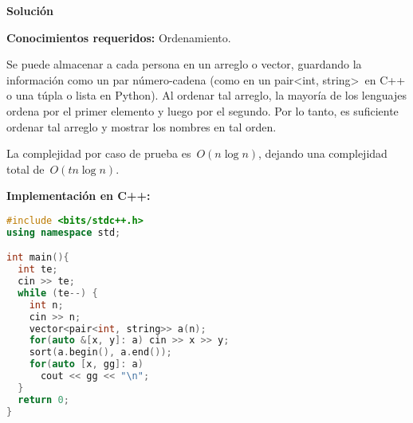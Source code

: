 \vspace*{0cm}
{\Large\textbf{Solución}}

\textbf{Conocimientos requeridos:} Ordenamiento.

Se puede almacenar a cada persona en un arreglo o vector, guardando la información
como un par número-cadena (como en un pair\textless int, string\textgreater \, en C++
o una túpla o lista en Python). Al ordenar tal arreglo, la mayoría de los lenguajes
ordena por el primer elemento y luego por el segundo. Por lo tanto, es suficiente
ordenar tal arreglo y mostrar los nombres en tal orden.

La complejidad por caso de prueba es~$O(n\log n)$, dejando una complejidad total
de~$O(tn \log n)$.

\textbf{Implementación en C++:}

\begin{lstlisting}[language=C++]
#include <bits/stdc++.h>
using namespace std;

int main(){
  int te;
  cin >> te;
  while (te--) {
    int n;
    cin >> n;
    vector<pair<int, string>> a(n);
    for(auto &[x, y]: a) cin >> x >> y;
    sort(a.begin(), a.end());
    for(auto [x, gg]: a)
      cout << gg << "\n";
  }
  return 0;
}
\end{lstlisting}

\newpage

